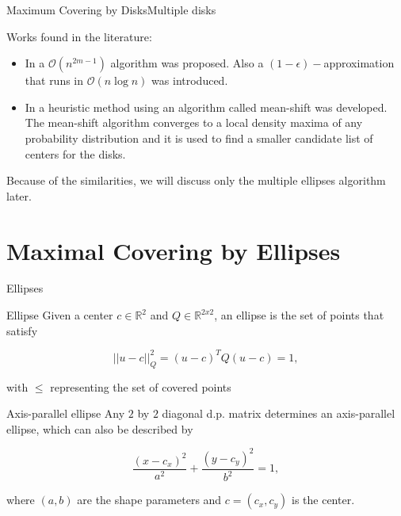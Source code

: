 \documentclass{beamer}
\newcommand{\R}{\mathbb{R}}
\newcommand{\bigO}{\mathscr{O}}
\begin{document}
\begin{frame}{Maximum Covering by Disks}{Multiple disks}
	
	Works found in the literature:
	
	\begin{itemize}
		\item In \autocite{cabello:2006} a $\bigO(n^{2m-1})$ algorithm was proposed. Also a $(1-\epsilon)-$approximation that runs in $\bigO(n\log{n})$ was introduced.
		
		\item In \autocite{zhou} a heuristic method using an algorithm called mean-shift was developed. The mean-shift algorithm converges to a local density maxima of any probability distribution and it is used to find a smaller candidate list of centers for the disks.
	\end{itemize}
	
	Because of the similarities, we will discuss only the multiple ellipses algorithm later.
	
\end{frame}
\section{Maximal Covering by Ellipses}

\begin{frame}{Ellipses}
	
	\begin{block}{Ellipse}
		Given a center $c \in \R^2$ and $Q \in \R^ {2x2}$, an ellipse is the set of points that satisfy
		
		\begin{equation*}
		||u-c||_Q^2 = (u-c)^TQ(u-c) = 1,
		\end{equation*}
		
		with $\le$ representing the set of covered points
	\end{block}
	
	\begin{block}{Axis-parallel ellipse}
		Any $2$ by $2$ diagonal d.p. matrix determines an axis-parallel ellipse, which can also be described by
		
		\begin{equation*}
		\frac{(x-c_x)^2}{a^2} + \frac{(y-c_y)^2}{b^2} = 1,
		\end{equation*}
		
		where $(a,b)$ are the shape parameters and $c=(c_x,c_y)$ is the center.
	\end{block}
	
\end{frame}
\end{document}
